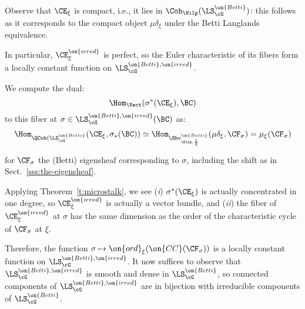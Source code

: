 \documentclass[9pt]{amsart}
\theoremstyle{remark}
\theoremstyle{definition}
\theoremstyle{remark}
\newcommand{\thmref}[1]{Theorem~\ref{#1}}
\newcommand{\secref}[1]{Sect.~\ref{#1}}
\numberwithin{equation}{section}
\begin{document}
Observe that $\CE_{\xi}$ is compact, i.e., it lies in 
$\Coh_{\Nilp}(\LS_{\cG}^{\on{Betti}})$: this follows as it
corresponds to the compact object $\mu\delta_{\xi}$ under the Betti Langlands
equivalence.

\medskip 

In particular, $\CE_{\xi}^{\on{irred}}$ is perfect, so the Euler characteristic of
its fibers form a locally constant function on $\LS_\cG^{\on{Betti},\on{irred}}$.

\medskip  

We compute the dual: 
%
\[
\Hom_{\Vect}(\sigma^*(\CE_{\xi}),\BC)
\]
%
\noindent to this fiber at $\sigma \in \LS_{\cG}^{\on{Betti},\on{irred}}(\BC)$ as:
%
\[
\Hom_{\QCoh(\LS_{\cG}^{\on{Betti}}}(\CE_{\xi},\sigma_*(\BC))
\simeq 
\Hom_{\Shv_{\Nilp,\frac{1}{2}}^{\on{Betti}}}
(\mu\delta_{\xi},
\CF_{\sigma}) = \mu_{\xi}(\CF_{\sigma})
\]

\noindent for $\CF_{\sigma}$ the (Betti) eigensheaf corresponding to $\sigma$,
including the shift as in \secref{sss:the-eigensheaf}.

Applying \thmref{t:microstalk}, we see 
(\emph{i}) $\sigma^*(\CE_{\xi})$ is actually concentrated in 
one degree, so $\CE_{\xi}^{\on{irred}}$ is actually a vector bundle,
and (\emph{ii}) the fiber of $\CE_{\xi}^{\on{irred}}$ at 
$\sigma$ has the same dimension as the order of the characteristic cycle
of $\CF_{\sigma}$ at $\xi$. 

\medskip 

Therefore, the function $\sigma \mapsto \on{ord}_{\xi}(\on{CC}(\CF_{\sigma}))$
is a locally constant function on $\LS_{\cG}^{\on{Betti},\on{irred}}$.
It now suffices to observe that 
$\LS_{\cG}^{\on{Betti},\on{irred}}$ is smooth and dense in $\LS_{\cG}^{\on{Betti}}$, 
so connected components of $\LS_{\cG}^{\on{Betti},\on{irred}}$ are in bijection with
irreducible components of $\LS_{\cG}^{\on{Betti}}$. 
\end{document}
